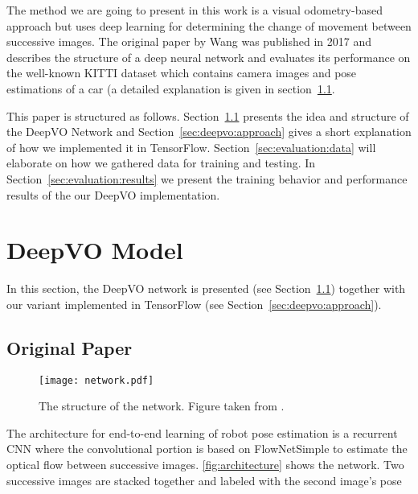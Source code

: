 \documentclass[a4paper,11pt]{article}
\begin{document}
The method we are going to present in this work is a visual odometry-based
approach but uses deep learning for determining the change of movement between
successive images. The original paper by Wang \etal{} \cite{wang2017deepvo} was
published in 2017 and describes the structure of a deep neural network
and evaluates its performance on the well-known KITTI dataset
which contains camera images and pose estimations of a car (a detailed
explanation is given in section~\ref{sec:deepvo:original}.

This paper is structured as follows. Section~\ref{sec:deepvo:original} presents
the idea and structure of the DeepVO Network and
Section~\ref{sec:deepvo:approach} gives a short explanation of how we
implemented it in TensorFlow. Section~\ref{sec:evaluation:data} will elaborate
on how we gathered data for training and testing. In
Section~\ref{sec:evaluation:results} we present the training behavior and
performance results of the our DeepVO implementation.


\section{DeepVO Model}
\label{sec:deepvo}
In this section, the DeepVO network is presented (see Section~\ref{sec:deepvo:original}) together with our variant implemented in TensorFlow (see Section~\ref{sec:deepvo:approach}).


\subsection{Original Paper}
\label{sec:deepvo:original}

\begin{figure}[tbh]
    \centering
    \texttt{[image: network.pdf]}
    \caption{The structure of the network. Figure taken from \cite{wang2017deepvo}.}
    \label{fig:network}
\end{figure}


The architecture for end-to-end learning of robot pose estimation is a recurrent
CNN where the convolutional portion is based on FlowNetSimple \citep{flownet} to
estimate the optical flow between successive images. \autoref{fig:architecture}
shows the network. Two successive images are stacked together and labeled with
the second image's pose
\end{document}
